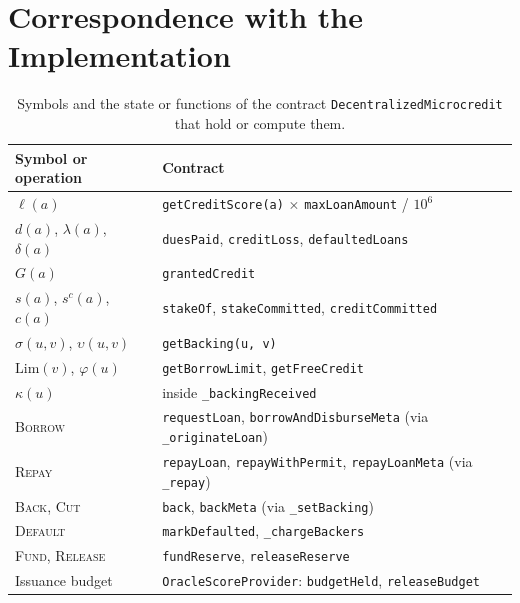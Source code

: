 \documentclass[acmsmall,nonacm,screen]{acmart}
\theoremstyle{acmdefinition}%
\newcommand{\Lim}{\mathrm{Lim}}
\newcommand{\Op}[1]{\textsc{#1}}
\begin{document}
\section{Correspondence with the Implementation}\label{app:implementation}

\begin{table}[h]
  \caption{Symbols and the state or functions of the contract \texttt{DecentralizedMicrocredit} that
  hold or compute them.}
  \label{tab:impl}
  \centering\small
  \begin{tabular}{ll}
    \toprule
    Symbol or operation & Contract \\
    \midrule
    $\ell(a)$ & \texttt{getCreditScore(a)} $\times$ \texttt{maxLoanAmount} / $10^6$ \\
    $d(a)$, $\lambda(a)$, $\delta(a)$ & \texttt{duesPaid}, \texttt{creditLoss}, \texttt{defaultedLoans} \\
    $G(a)$ & \texttt{grantedCredit} \\
    $s(a)$, $s^c(a)$, $c(a)$ & \texttt{stakeOf}, \texttt{stakeCommitted}, \texttt{creditCommitted} \\
    $\sigma(u,v)$, $\upsilon(u,v)$ & \texttt{getBacking(u, v)} \\
    $\Lim(v)$, $\varphi(u)$ & \texttt{getBorrowLimit}, \texttt{getFreeCredit} \\
    $\kappa(u)$ & inside \texttt{\_backingReceived} \\
    \Op{Borrow} & \texttt{requestLoan}, \texttt{borrowAndDisburseMeta} (via \texttt{\_originateLoan}) \\
    \Op{Repay} & \texttt{repayLoan}, \texttt{repayWithPermit}, \texttt{repayLoanMeta} (via \texttt{\_repay}) \\
    \Op{Back}, \Op{Cut} & \texttt{back}, \texttt{backMeta} (via \texttt{\_setBacking}) \\
    \Op{Default} & \texttt{markDefaulted}, \texttt{\_chargeBackers} \\
    \Op{Fund}, \Op{Release} & \texttt{fundReserve}, \texttt{releaseReserve} \\
    Issuance budget & \texttt{OracleScoreProvider}: \texttt{budgetHeld}, \texttt{releaseBudget} \\
    \bottomrule
  \end{tabular}
\end{table}
\end{document}
